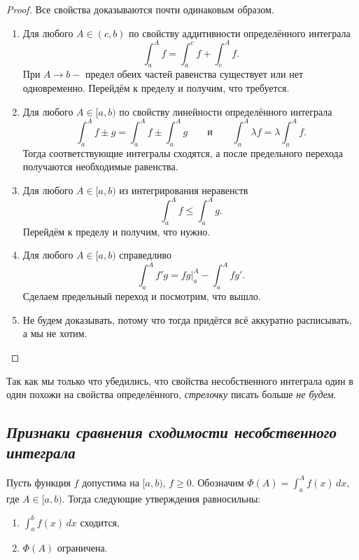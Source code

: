 \begin{proof}
	Все свойства доказываются почти одинаковым образом.
	\begin{enumerate}
		\item Для любого \(A \in (c, b)\) по свойству аддитивности определённого интеграла \[
		\int_a^A f = \int_a^c f + \int_c^A f.
		\]
		При \(A \to b-\) предел обеих частей равенства существует или нет одновременно. Перейдём к пределу и получим, что требуется.
		\item Для любого \(A \in [a, b)\) по свойству линейности определённого интеграла \[
		\int_a^A f \pm g = \int_a^A f \pm \int_a^A g \qquad \text{и} \qquad \int_a^A \lambda f = \lambda \int_a^A f.
		\]
		Тогда соответствующие интегралы сходятся, а после предельного перехода получаются необходимые равенства.
		\item Для любого \(A \in [a, b)\) из интегрирования неравенств \[
		\int_a^A f \leqslant\int_a^A g.
		\]
		Перейдём к пределу и получим, что нужно.
		\item Для любого \(A \in [a, b)\) справедливо \[
		\int_a^A f'g = fg \bigg|_a^A - \int_a^A fg'.
		\]
		Сделаем предельный переход и посмотрим, что вышло.
		\item Не будем доказывать, потому что тогда придётся всё аккуратно расписывать, а мы не хотим.
	\end{enumerate}
\end{proof}

\begin{remark}
	Так как мы только что убедились, что свойства несобственного интеграла один в один похожи на свойства определённого, \textit{стрелочку} писать больше \textit{не будем}.
\end{remark}

\subsection{\itshape Признаки сравнения сходимости несобственного интеграла}

\hypertarget{srshlem}{}
\begin{lemma}
	Пусть функция \(f\) допустима на \([a, b)\), \(f \geqslant 0\). Обозначим \linebreak \(\Phi(A) = \displaystyle\int_a^A f(x) \, dx\), где \(A \in [a, b)\). Тогда следующие утверждения равносильны:
	\begin{enumerate}
		\item \(\displaystyle\int_a^b f(x) \, dx\) сходится,
		\item \(\Phi(A)\) ограничена.
	\end{enumerate}
\end{lemma}

